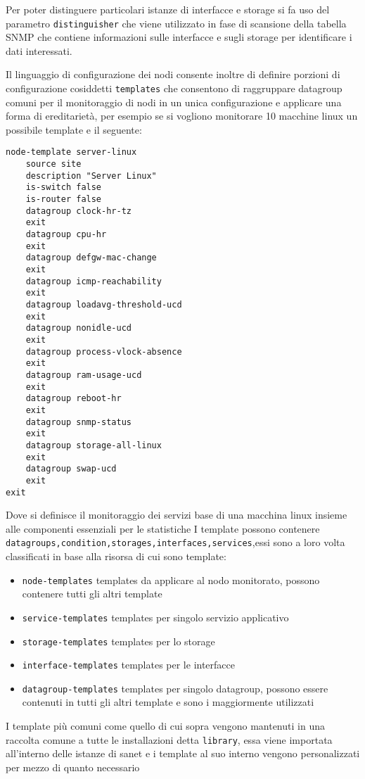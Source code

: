 Per poter distinguere particolari istanze di interfacce e storage si fa uso del parametro \verb|distinguisher| che viene utilizzato in fase di scansione della tabella SNMP che contiene informazioni sulle interfacce e sugli storage per identificare i dati interessati.

Il linguaggio di configurazione dei nodi consente inoltre di definire porzioni di configurazione cosiddetti \verb|templates| che consentono di raggruppare datagroup comuni per il monitoraggio di nodi in un unica configurazione e applicare una forma di ereditarietà, per esempio se si vogliono monitorare 10 macchine linux un possibile template e il seguente:


\begin{lstlisting}
node-template server-linux
    source site
    description "Server Linux"
    is-switch false
    is-router false
    datagroup clock-hr-tz
    exit
    datagroup cpu-hr
    exit
    datagroup defgw-mac-change
    exit
    datagroup icmp-reachability
    exit
    datagroup loadavg-threshold-ucd
    exit
    datagroup nonidle-ucd
    exit
    datagroup process-vlock-absence
    exit
    datagroup ram-usage-ucd
    exit
    datagroup reboot-hr
    exit
    datagroup snmp-status
    exit
    datagroup storage-all-linux
    exit
    datagroup swap-ucd
    exit
exit
\end{lstlisting}

Dove si definisce il monitoraggio dei servizi base di una macchina linux insieme alle componenti essenziali per le statistiche
I template possono contenere \verb|datagroups,condition,storages,interfaces,services|,essi sono a loro volta classificati in base alla risorsa di cui sono template:

\begin{itemize}
  \item \verb|node-templates| templates da applicare al nodo monitorato, possono contenere tutti gli altri template
  \item \verb|service-templates| templates per singolo servizio applicativo
  \item \verb|storage-templates| templates per lo storage
  \item \verb|interface-templates| templates per le interfacce
  \item \verb|datagroup-templates| templates per singolo datagroup, possono essere contenuti in tutti gli altri template e sono i maggiormente utilizzati
\end{itemize}

I template più comuni come quello di cui sopra vengono mantenuti in una raccolta comune a tutte le installazioni detta \verb|library|, essa viene importata all'interno delle istanze di sanet e i template al suo interno vengono personalizzati per mezzo di quanto necessario

